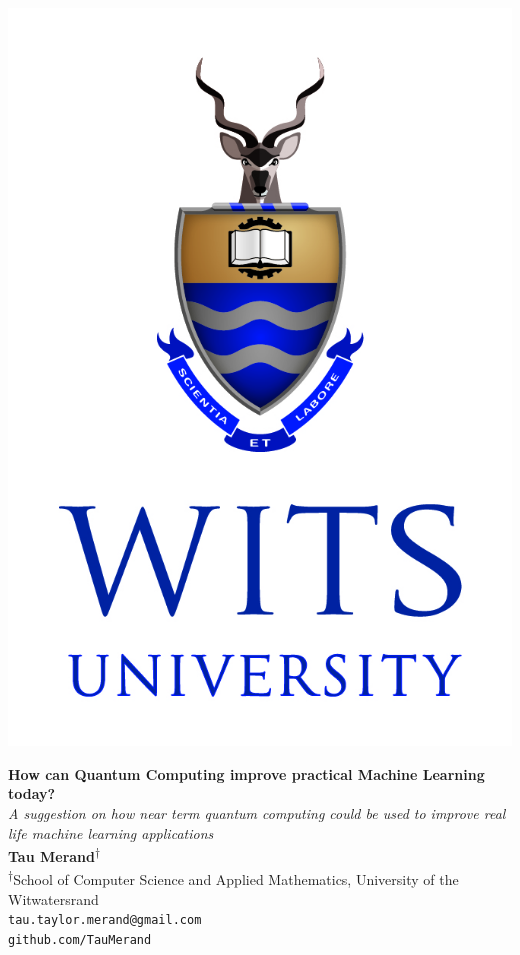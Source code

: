 \documentclass[a0,portrait]{a0poster}
\begin{document}
\begin{minipage}[c]{0.08\linewidth}%
\includegraphics[width=\linewidth]{witslogo}\\%
\end{minipage}%
\begin{minipage}[c]{0.78\linewidth}%
\centering%
\veryHuge \color{NavyBlue} \textbf{How can Quantum Computing improve practical  Machine Learning today?}%
 \color{Black}\\[0.3cm]%
\Huge\textit{A suggestion on how near term quantum computing could be used to improve real life machine learning applications}\\[1.2cm]%
\large \textbf{Tau Merand\textsuperscript{$\dagger$}}\\[0.5cm]%
\normalsize \textsuperscript{$\dagger$}School of Computer Science and Applied Mathematics, University of the Witwatersrand\\%
\texttt{tau.taylor.merand@gmail.com\\ github.com/TauMerand}\\%
\end{minipage}%
\end{document}
